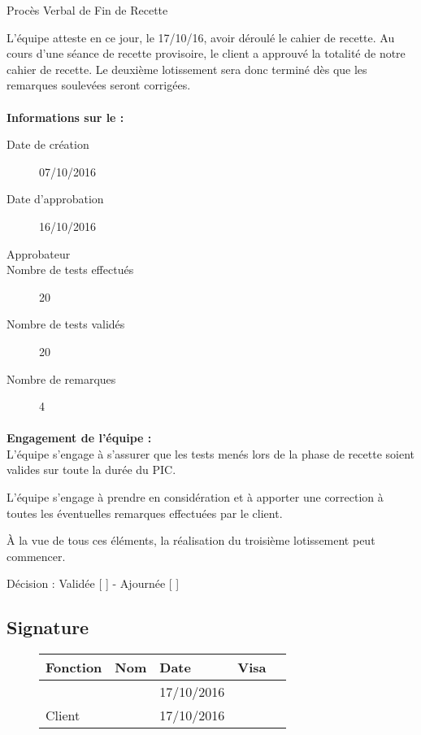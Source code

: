 \documentclass[asi, sansVersion]{picInsa}
\begin{document}
 
 \begin{center}
  \LARGE{}
    Procès Verbal de Fin de Recette\\
 \end{center}
 
 \normalsize{}
 
L'équipe \nomEquipe{} atteste en ce jour, le 17/10/16, avoir déroulé le cahier de recette.
Au cours d'une séance de recette provisoire, le client a approuvé la totalité de notre cahier de recette. Le deuxième lotissement sera donc terminé dès que les remarques soulevées seront corrigées.


\paragraph{}
\textbf{Informations sur le \CDR :}

\begin{description}
  \item[Date de création]07/10/2016
  \item[Date d'approbation]16/10/2016
  \item[Approbateur]\nomClient
  \item[Nombre de tests effectués]20
  \item[Nombre de tests validés]20
  \item[Nombre de remarques]4
\end{description}


\paragraph{}
\textbf{Engagement de l'équipe :}\\


L'équipe \nomEquipe{} s'engage à s'assurer que les tests menés lors de la phase de recette soient valides sur toute la durée du PIC.


L'équipe \nomEquipe{} s'engage à prendre en considération et à apporter une correction à toutes les éventuelles remarques effectuées par le client.

À la vue de tous ces éléments, la réalisation du troisième lotissement peut commencer.

\begin{center}
Décision : Validée [ \checkmark{} ] - Ajournée [ ]
\end{center}

\subsection*{Signature}
\begin{figure}[H]
		\centering
		\begin{tabularx}{17cm}{|p{4cm}|X|X|X|X|}
		\hline
		\rowcolor[gray]{0.85} Fonction & Nom & Date & Visa \\
		\hline
		\CP{} & \Pierre{} & 17/10/2016 & \\
		\hline
		Client & \nomClient & 17/10/2016 & \\
		\hline
		\end{tabularx}
\end{figure}
\end{document}

